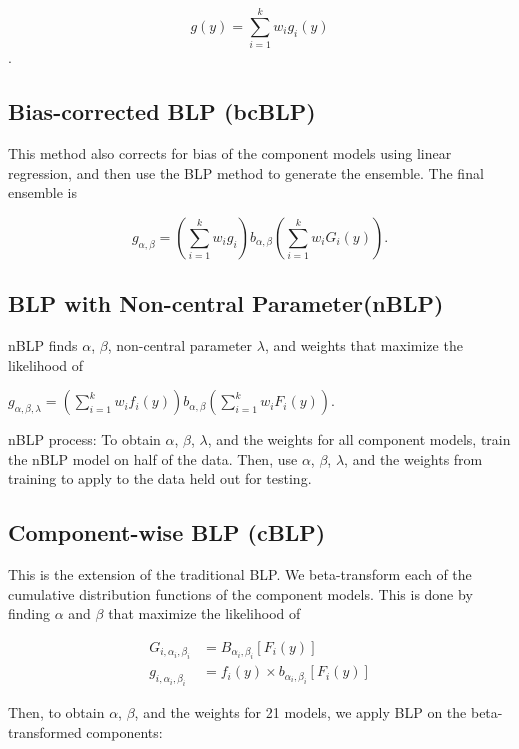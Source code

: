 \documentclass[]{article}
\begin{document}
\[g(y)=\sum_{i=1}^k w_ig_i(y)\].

\hypertarget{bias-corrected-blp-bcblp}{%
\subsection{Bias-corrected BLP (bcBLP)}\label{bias-corrected-blp-bcblp}}

This method also corrects for bias of the component models using linear
regression, and then use the BLP method to generate the ensemble. The
final ensemble is

\[g_{\alpha,\beta}=(\sum_{i=1}^k w_ig_i)b_{\alpha,\beta}(\sum_{i=1}^k w_iG_i(y)).\]

\hypertarget{blp-with-non-central-parameternblp}{%
\subsection{BLP with Non-central
Parameter(nBLP)}\label{blp-with-non-central-parameternblp}}

nBLP finds \(\alpha\), \(\beta\), non-central parameter \(\lambda\), and
weights that maximize the likelihood of

\(g_{\alpha,\beta,\lambda}=(\sum_{i=1}^k w_if_i(y))b_{\alpha,\beta}(\sum_{i=1}^k w_iF_i(y)).\)

nBLP process: To obtain \(\alpha\), \(\beta\), \(\lambda\), and the
weights for all component models, train the nBLP model on half of the
data. Then, use \(\alpha\), \(\beta\), \(\lambda\), and the weights from
training to apply to the data held out for testing.

\hypertarget{component-wise-blp-cblp}{%
\subsection{Component-wise BLP (cBLP)}\label{component-wise-blp-cblp}}

This is the extension of the traditional BLP. We beta-transform each of
the cumulative distribution functions of the component models. This is
done by finding \(\alpha\) and \(\beta\) that maximize the likelihood of

\[
\begin{aligned}
G_{i,\alpha_i,\beta_i} &= B_{\alpha_i,\beta_i}[F_i(y)]\\
g_{i,\alpha_i,\beta_i} &= f_i(y) \times b_{\alpha_i,\beta_i}[F_i(y)]
\end{aligned}
\]

Then, to obtain \(\alpha\), \(\beta\), and the weights for 21 models, we
apply BLP on the beta-transformed components:
\end{document}
